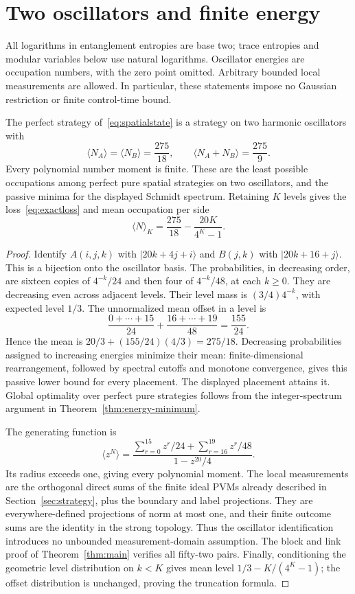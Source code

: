 \section{Two oscillators and finite energy}\label{sec:oscillators}
All logarithms in entanglement entropies are base two; trace entropies and modular variables below use natural logarithms. Oscillator energies are occupation numbers, with the zero point omitted. Arbitrary bounded local measurements are allowed. In particular, these statements impose no Gaussian restriction or finite control-time bound.

\begin{theorem}\label{thm:oscillators}
The perfect strategy of~\eqref{eq:spatialstate} is a strategy on two harmonic oscillators with
\[
 \langle N_A\rangle=\langle N_B\rangle=\frac{275}{18},\qquad
 \langle N_A+N_B\rangle=\frac{275}{9}.
\]
Every polynomial number moment is finite. These are the least possible occupations among perfect pure spatial strategies on two oscillators, and the passive minima for the displayed Schmidt spectrum. Retaining $K$ levels gives the loss~\eqref{eq:exactloss} and mean occupation per side
\[
 \langle N\rangle_K=\frac{275}{18}-\frac{20K}{4^K-1}.
\]
\end{theorem}
\begin{proof}
Identify $A(i,j,k)$ with $|20k+4j+i\rangle$ and $B(j,k)$ with $|20k+16+j\rangle$. This is a bijection onto the oscillator basis. The probabilities, in decreasing order, are sixteen copies of $4^{-k}/24$ and then four of $4^{-k}/48$, at each $k\ge0$. They are decreasing even across adjacent levels. Their level mass is $(3/4)4^{-k}$, with expected level $1/3$. The unnormalized mean offset in a level is
\[
 \frac{0+\cdots+15}{24}+\frac{16+\cdots+19}{48}=\frac{155}{24}.
\]
Hence the mean is $20/3+(155/24)(4/3)=275/18$. Decreasing probabilities assigned to increasing energies minimize their mean: finite-dimensional rearrangement, followed by spectral cutoffs and monotone convergence, gives this passive lower bound for every placement. The displayed placement attains it. Global optimality over perfect pure strategies follows from the integer-spectrum argument in Theorem~\ref{thm:energy-minimum}.

The generating function is
\[
 \langle z^N\rangle=
 \frac{\sum_{r=0}^{15}z^r/24+\sum_{r=16}^{19}z^r/48}{1-z^{20}/4}.
\]
Its radius exceeds one, giving every polynomial moment. The local measurements are the orthogonal direct sums of the finite ideal PVMs already described in Section~\ref{sec:strategy}, plus the boundary and label projections. They are everywhere-defined projections of norm at most one, and their finite outcome sums are the identity in the strong topology. Thus the oscillator identification introduces no unbounded measurement-domain assumption. The block and link proof of Theorem~\ref{thm:main} verifies all fifty-two pairs. Finally, conditioning the geometric level distribution on $k<K$ gives mean level $1/3-K/(4^K-1)$; the offset distribution is unchanged, proving the truncation formula.
\end{proof}

